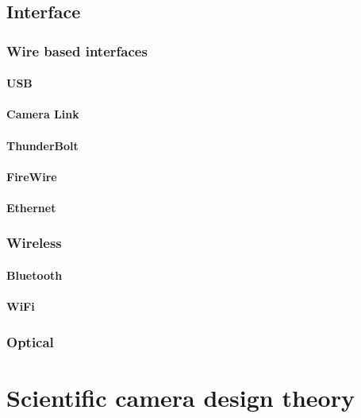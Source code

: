        \subsection{Interface}
          \subsubsection{Wire based interfaces}
            \paragraph{USB}
            \paragraph{Camera Link}
            \paragraph{ThunderBolt}
            \paragraph{FireWire}
            \paragraph{Ethernet}
          \subsubsection{Wireless}
            \paragraph{Bluetooth}
            \paragraph{WiFi}
          \subsubsection{Optical}

  
 
  \section{Scientific camera design theory}
  
